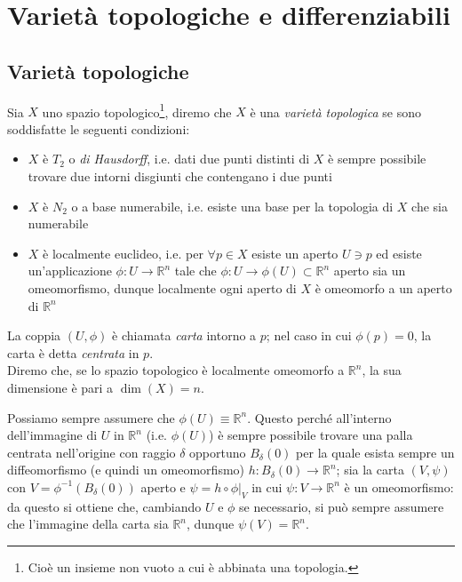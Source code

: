\section{Varietà topologiche e differenziabili}

\subsection{Varietà topologiche}

Sia $ X $ uno spazio topologico\footnote{%
	Cioè un insieme non vuoto a cui è abbinata una topologia.%
}, diremo che $ X $ è una \textit{varietà topologica} se sono soddisfatte le seguenti condizioni:

\begin{itemize}
	\item $ X $ è $ T_{2} $ o \textit{di Hausdorff}, i.e. dati due punti distinti di $ X $ è sempre possibile trovare due intorni disgiunti che contengano i due punti
	
	\item $ X $ è $ N_{2} $ o a base numerabile, i.e. esiste una base per la topologia di $ X $ che sia numerabile
	
	\item $ X $ è localmente euclideo, i.e. per $ \forall p \in X $ esiste un aperto $ U \ni p $ ed esiste un'applicazione $ \phi : U \to \mathbb{R}^{n} $ tale che $ \phi : U \to \phi(U) \subset \mathbb{R}^{n} $ aperto sia un omeomorfismo, dunque localmente ogni aperto di $ X $ è omeomorfo a un aperto di $ \mathbb{R}^{n} $
\end{itemize}

La coppia $ (U,\phi) $ è chiamata \textit{carta} intorno a $ p $; nel caso in cui $ \phi(p)=0 $, la carta è detta \textit{centrata} in $ p $.\\
Diremo che, se lo spazio topologico è localmente omeomorfo a $ \mathbb{R}^{n} $, la sua dimensione è pari a $ \dim (X) = n $.

\begin{remark}
	Possiamo sempre assumere che $ \phi(U) \equiv \mathbb{R}^{n} $. Questo perché all'interno dell'immagine di $ U $ in $ \mathbb{R}^{n} $ (i.e. $ \phi(U) $) è sempre possibile trovare una palla centrata nell'origine con raggio $ \delta $ opportuno $ B_{\delta}(0) $ per la quale esista sempre un diffeomorfismo (e quindi un omeomorfismo) $ h : B_{\delta}(0) \to \mathbb{R}^{n} $; sia la carta $ (V,\psi) $ con $ V = \phi^{-1}(B_{\delta}(0)) $ aperto e $ \psi = h \circ \left. \phi \right|_{V} $ in cui $ \psi : V \to \mathbb{R}^{n} $ è un omeomorfismo: da questo si ottiene che, cambiando $ U $ e $ \phi $ se necessario, si può sempre assumere che l'immagine della carta sia $ \mathbb{R}^{n} $, dunque $ \psi(V) = \mathbb{R}^{n} $.
	
\end{remark}

